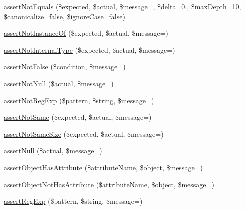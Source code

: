 \begin{DoxyCompactItemize}
\item 
\mbox{\hyperlink{_functions_8php_a8b173542fda20226a611bfafc7f25a7a}{assert\+Not\+Equals}} (\$expected, \$actual, \$message=\textquotesingle{}\textquotesingle{}, \$delta=0., \$max\+Depth=10, \$canonicalize=false, \$ignore\+Case=false)
\item 
\mbox{\hyperlink{_functions_8php_aed1f07f58861b2876519c2881ebd62d8}{assert\+Not\+Instance\+Of}} (\$expected, \$actual, \$message=\textquotesingle{}\textquotesingle{})
\item 
\mbox{\hyperlink{_functions_8php_a46c59eca3b9372703a32bf12363174a6}{assert\+Not\+Internal\+Type}} (\$expected, \$actual, \$message=\textquotesingle{}\textquotesingle{})
\item 
\mbox{\hyperlink{_functions_8php_abcdbf78d3c38e04fa94b18e71324161e}{assert\+Not\+False}} (\$condition, \$message=\textquotesingle{}\textquotesingle{})
\item 
\mbox{\hyperlink{_functions_8php_ad4d6f4886ac98239030e236aa0707b2e}{assert\+Not\+Null}} (\$actual, \$message=\textquotesingle{}\textquotesingle{})
\item 
\mbox{\hyperlink{_functions_8php_a0868f00d7063ddbf09a34c9a4ab8d462}{assert\+Not\+Reg\+Exp}} (\$pattern, \$string, \$message=\textquotesingle{}\textquotesingle{})
\item 
\mbox{\hyperlink{_functions_8php_a150d3c4fcea8c66eefa1959a01cbd585}{assert\+Not\+Same}} (\$expected, \$actual, \$message=\textquotesingle{}\textquotesingle{})
\item 
\mbox{\hyperlink{_functions_8php_a7a040c1da3e10262995022756a403805}{assert\+Not\+Same\+Size}} (\$expected, \$actual, \$message=\textquotesingle{}\textquotesingle{})
\item 
\mbox{\hyperlink{_functions_8php_ad7b79d6bea1921f7a70ed6878cc0f246}{assert\+Null}} (\$actual, \$message=\textquotesingle{}\textquotesingle{})
\item 
\mbox{\hyperlink{_functions_8php_a0c4cc883af06670a8e6544ae62c200f9}{assert\+Object\+Has\+Attribute}} (\$attribute\+Name, \$object, \$message=\textquotesingle{}\textquotesingle{})
\item 
\mbox{\hyperlink{_functions_8php_ada1bfafe4eeb619549e641de3f71f181}{assert\+Object\+Not\+Has\+Attribute}} (\$attribute\+Name, \$object, \$message=\textquotesingle{}\textquotesingle{})
\item 
\mbox{\hyperlink{_functions_8php_a84e561a3e6b295ae36a098b2170da01c}{assert\+Reg\+Exp}} (\$pattern, \$string, \$message=\textquotesingle{}\textquotesingle{})
\item 

\end{DoxyCompactItemize}
